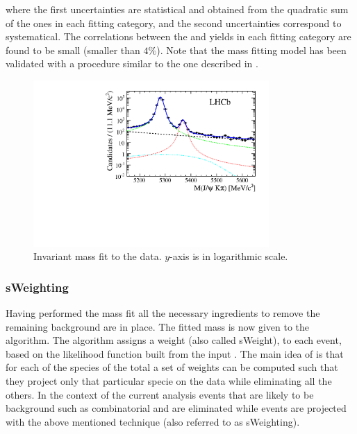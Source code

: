 \noindent where the first uncertainties are statistical and obtained from the quadratic sum of the ones in each fitting category,
and the second uncertainties correspond to systematical. The correlations between the \Bd and \Bs yields in each fitting category
are found to be small (smaller than $4\%$). Note that the mass fitting model has been validated with a procedure similar to the
one described in .

\begin{figure}[h]
\begin{center}
  \includegraphics[width=0.8\textwidth]{Figures/Chapter4/mass_plot_simul_log.pdf}
  \caption{Invariant mass fit to the data. $y$-axis is in logarithmic scale.}
  \label{mass_plot}
\end{center}
\end{figure}

\subsubsection{sWeighting}
Having performed the mass fit all the necessary ingredients to remove the remaining background are in place.
The fitted mass \pdf is now given to the \sPlot algorithm. The algorithm assigns a weight (also called sWeight), to each event,
based on the likelihood function built from the input \pdf. The main idea of \sPlot is that for each of the species of the total
\pdf a set of weights can be computed such that they project only that particular specie on the data while eliminating all the others.
In the context of the current analysis events that are likely to be background such as combinatorial and \LbJpsipK are
eliminated while \BJpsiKst events are projected with the above mentioned technique (also referred to as sWeighting).

